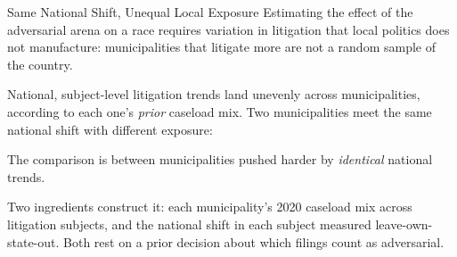 
\begin{frame}{Same National Shift, Unequal Local Exposure}
\hypertarget{src:variation}{}
\small
Estimating the effect of the adversarial arena on a race requires variation in litigation that local politics does not manufacture: municipalities that litigate more are not a random sample of the country.
\smallskip

National, subject-level litigation trends land unevenly across municipalities, according to each one's \emph{prior} caseload mix. Two municipalities meet the same national shift with different exposure:
\vspace{2pt}
\begin{center}
\end{center}
\vspace{2pt}
\centerline{\footnotesize The comparison is between municipalities pushed harder by \emph{identical} national trends.}
\smallskip
\footnotesize Two ingredients construct it: each municipality's 2020 caseload mix across litigation subjects, and the national shift in each subject measured leave-own-state-out. Both rest on a prior decision about which filings count as adversarial.
\end{frame}
